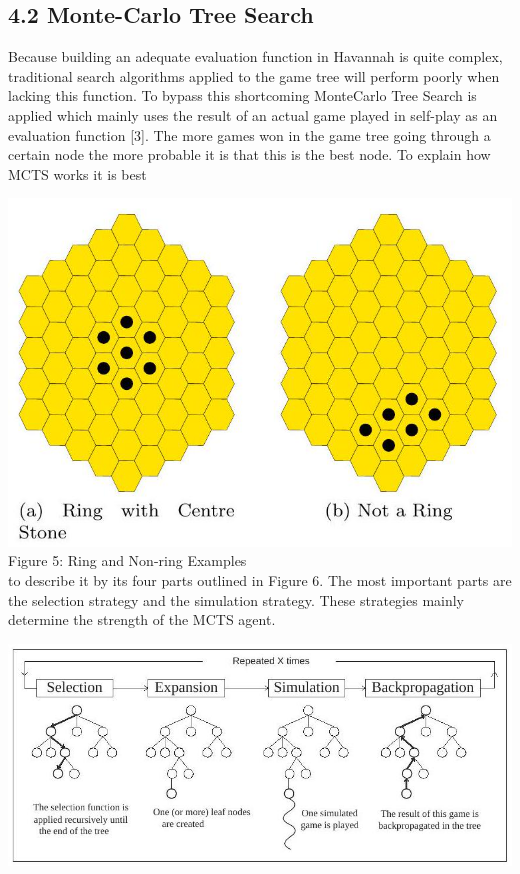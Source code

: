\documentclass[10pt]{article}
\begin{document}
\subsection*{4.2 Monte-Carlo Tree Search}
Because building an adequate evaluation function in Havannah is quite complex, traditional search algorithms applied to the game tree will perform poorly when lacking this function. To bypass this shortcoming MonteCarlo Tree Search is applied which mainly uses the result of an actual game played in self-play as an evaluation function [3]. The more games won in the game tree going through a certain node the more probable it is that this is the best node. To explain how MCTS works it is best

\includegraphics[max width=\textwidth, center]{2024_09_21_575efd6e0a8f951a52dfg-4(1)}\\
Figure 5: Ring and Non-ring Examples\\
to describe it by its four parts outlined in Figure 6. The most important parts are the selection strategy and the simulation strategy. These strategies mainly determine the strength of the MCTS agent.

\begin{center}
\includegraphics[max width=\textwidth]{2024_09_21_575efd6e0a8f951a52dfg-4}
\end{center}
\end{document}
